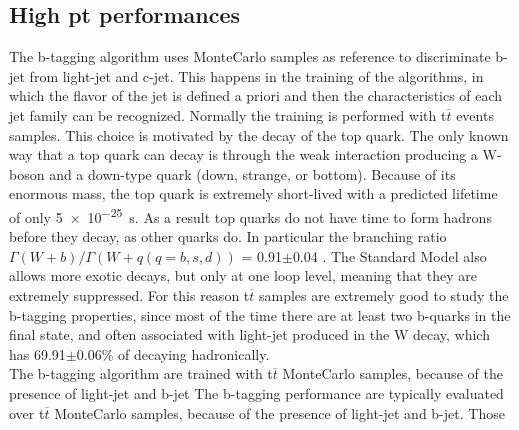 \subsection{High pt performances}
The b-tagging algorithm uses MonteCarlo samples as reference to discriminate b-jet from light-jet and c-jet. This happens in the training of the algorithms, in which the flavor of the jet is defined a priori and then the characteristics of each jet family can be recognized. Normally the training is performed with t$\overline{t}$ events samples. This choice is motivated by the decay of the top quark. The only known way that a top quark can decay is through the weak interaction producing a W-boson and a down-type quark (down, strange, or bottom). Because of its enormous mass, the top quark is extremely short-lived with a predicted lifetime of only \SI{5e-25}{\second}\cite{PDG}. As a result top quarks do not have time to form hadrons before they decay, as other quarks do. 
In particular the branching ratio $\Gamma(W+b) / \Gamma(W+q (q = b,s,d))$ = 0.91$\pm$0.04 \cite{PDG}. 
The Standard Model also allows more exotic decays, but only at one loop level, meaning that they are extremely suppressed. For this reason t$\overline{t}$ samples are extremely good to study the b-tagging properties, since most of the time there are at least two b-quarks in the final state, and often associated with light-jet produced in the W decay, which has 69.91$\pm$0.06\% of decaying hadronically.\\


The b-tagging algorithm are trained with t$\overline{t}$ MonteCarlo samples, because of the presence of light-jet and b-jet
The b-tagging performance are typically evaluated over t$\overline{t}$ MonteCarlo samples, because of the presence of light-jet and b-jet. Those

